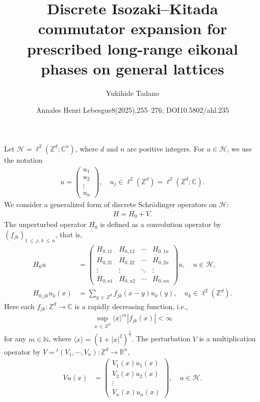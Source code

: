 \documentclass[10pt]{amsart}
\title[Discrete Isozaki--Kitada commutator expansion]{Discrete Isozaki--Kitada commutator expansion for prescribed long-range eikonal phases on general lattices}
\author{Yukihide Tadano}
\date{Annales Henri Lebesgue8(2025),255–276; DOI10.5802/ahl.235}
\theoremstyle{definition}
\numberwithin{equation}{section}
\newcommand{\Schr}{Schr\"odinger }
\newcommand{\C}{\mathbb{C}}
\newcommand{\R}{\mathbb{R}}
\newcommand{\Z}{\mathbb{Z}}
\newcommand{\bbN}{\mathbb{N}}
\newcommand{\HS}{\mathcal{H}}
\newcommand{\la}{\langle}
\newcommand{\ra}{\rangle}
\begin{document}
\maketitle
\setcounter{section}{1}
Let $\HS=\ell^2(\Z^d; \C^n)$, where $d$ and $n$ are positive integers. For $u \in \HS$, we use the notation
\begin{align*}
u=
\begin{pmatrix}
u_1 \\ u_2 \\ \vdots \\ u_n
\end{pmatrix}
, \quad u_j \in \ell^2\left(\Z^d\right)=\ell^2\left(\Z^d;\C\right).
\end{align*}
We consider a generalized form of discrete \Schr operators on $\HS$:
\begin{align*}
H=H_0+V.
\end{align*}
The unperturbed operator $H_0$ is defined as a convolution operator by $(f_{jk})_{1\,\leq\,j,\,k\,\leq\,n}$, that is,
\begin{align*}
H_0u &= 
\begin{pmatrix}
H_{0,11} & H_{0,12} & \cdots & H_{0,1n} \\
H_{0,21} & H_{0,22} & \cdots & H_{0,2n} \\
\vdots & \vdots & \ddots & \vdots \\
H_{0,n1} & H_{0,n2} & \cdots & H_{0,nn}
\end{pmatrix}
u, \quad u \in \HS, \\
H_{0,jk}u_k(x) &=\sum_{y\,\in\,\Z^d}f_{jk}(x-y)u_k(y), \quad u_k \in \ell^2\left(\Z^d\right).
\end{align*}
Here each $f_{jk}: \Z^d \rightarrow \C$ is a rapidly decreasing function, i.e.,
\begin{align*}
\sup_{x\,\in\,\Z^d} \la x \ra^m \left|f_{jk}(x)\right| <\infty
\end{align*}
for any $m\in\bbN$, where $\la x \ra = (1+|x|^2)^{\frac{1}{2}}$. The perturbation $V$ is a multiplication operator by $V={}^t(V_1,\cdots,V_n):\Z^d \to \R^n$,
\begin{align*}
Vu(x) &= 
\begin{pmatrix}
V_1(x) u_1(x) \\ V_2(x) u_2(x) \\ \vdots \\ V_n(x) u_n(x)
\end{pmatrix}
, \quad u \in \HS.
\end{align*}
\end{document}
